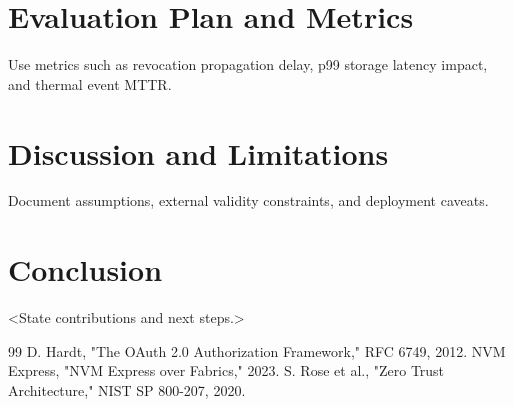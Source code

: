 \documentclass[conference]{IEEEtran}
\begin{document}
\section{Evaluation Plan and Metrics}
Use metrics such as revocation propagation delay, p99 storage latency impact, and thermal event MTTR.

\section{Discussion and Limitations}
Document assumptions, external validity constraints, and deployment caveats.

\section{Conclusion}
<State contributions and next steps.>


\begin{thebibliography}{99}
 D. Hardt, "The OAuth 2.0 Authorization Framework," RFC 6749, 2012.
 NVM Express, "NVM Express over Fabrics," 2023.
 S. Rose et al., "Zero Trust Architecture," NIST SP 800-207, 2020.
\end{thebibliography}
\end{document}

